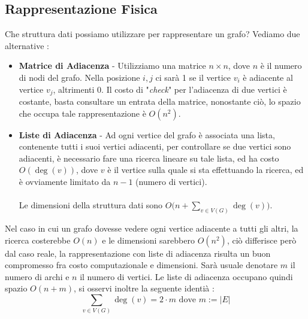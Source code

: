 \documentclass[12pt, letterpaper]{article}
\newcommand{\acc}{\\\hphantom{}\\}
\begin{document}
\subsection{Rappresentazione Fisica}
Che struttura dati possiamo utilizzare per rappresentare un grafo? Vediamo due alternative : \begin{itemize}
    \item \textbf{Matrice di Adiacenza} - Utilizziamo una matrice $n\times n$, dove \(n\) è il numero di
          nodi del grafo. Nella posizione \(i,j\) ci sarà 1 se il vertice \(v_i\) è adiacente al vertice
          \(v_j\), altrimenti 0. Il costo di "\textit{check}" per l'adiacenza di due vertici è costante, basta
          consultare un entrata della matrice, nonostante ciò, lo spazio che occupa tale rappresentazione è
          \(O(n^2)\).
    \item \textbf{Liste di Adiacenza} - Ad ogni vertice del grafo è associata una lista, contenente tutti
          i suoi vertici adiacenti, per controllare se due vertici sono adiacenti, è necessario fare una ricerca
          lineare su tale lista, ed ha costo $\displaystyle O(\deg(v))$, dove \(v\) è il vertice sulla
          quale si sta effettuando la ricerca, ed è ovviamente limitato da \(n-1\) (numero di vertici).\acc
          Le dimensioni della struttura dati sono $\displaystyle O\big(n + \sum_{v\in V(G)}\deg(v)\big)$.
\end{itemize}
Nel caso in cui un grafo dovesse vedere ogni vertice adiacente a tutti gli altri, la ricerca costerebbe
\(O(n)\) e le dimensioni sarebbero \(O(n^2)\), ciò differisce però dal caso reale, la rappresentazione con
liste di adiacenza risulta un buon compromesso fra costo computazionale e dimensioni.
Sarà usuale denotare \(m\) il numero di archi e \(n\) il numero di vertici.
Le liste di adiacenza occupano quindi spazio $O(n+m)$,  si osservi inoltre la
seguente identià : $$\sum_{v\in V(G)}\deg(v)=2\cdot m\text{ dove }m:=|E|$$
\end{document}
